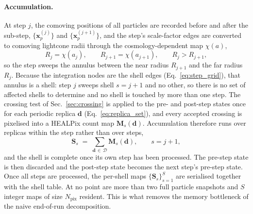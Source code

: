 \documentclass{report}
\begin{document}
\paragraph{Accumulation.} At step $j$, the comoving positions of all particles are recorded before and after the sub-step, $\{\mathbf{x}_p^{(j)}\}$ and $\{\mathbf{x}_p^{(j+1)}\}$, and the step's scale-factor edges are converted to comoving lightcone radii through the cosmology-dependent map $\chi(a)$,
\begin{equation}
  R_j = \chi(a_j), \qquad R_{j+1} = \chi(a_{j+1}), \qquad R_j > R_{j+1},
  \label{eq:step_radii}
\end{equation}
so the step sweeps the annulus between the near radius \mbox{$R_{j+1}$} and the far radius \mbox{$R_j$}. Because the integration nodes are the shell edges (Eq.~\ref{eq:step_grid}), that annulus is a shell: step \mbox{$j$} sweeps shell \mbox{$s = j+1$} and no other, so there is no set of affected shells to determine and no shell is touched by more than one step. The crossing test of Sec.~\ref{sec:crossing} is applied to the pre- and post-step states once for each periodic replica \mbox{$\mathbf{d}$} (Eq.~\ref{eq:replica_set}), and every accepted crossing is pixelised into a HEALPix count map \mbox{$\mathbf{M}_s(\mathbf{d})$}. Accumulation therefore runs over replicas within the step rather than over steps,
\begin{equation}
  \mathbf{S}_s \;=\; \sum_{\mathbf{d}\,\in\,\mathcal{D}} \mathbf{M}_s(\mathbf{d}), \qquad s = j+1,
  \label{eq:shell_update}
\end{equation}
and the shell is complete once its own step has been processed. The pre-step state is then discarded and the post-step state becomes the next step's pre-step state. Once all steps are processed, the per-shell maps $\{\mathbf{S}_s\}_{s=1}^{S}$ are serialised together with the shell table. At no point are more than two full particle snapshots and \mbox{$S$} integer maps of size \mbox{$N_{\mathrm{pix}}$} resident. This is what removes the memory bottleneck of the naive end-of-run decomposition.
\end{document}
